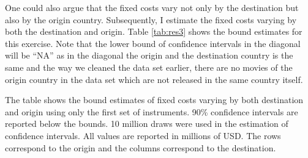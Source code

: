 \documentclass[11pt, letterpaper]{article} \usepackage{amsmath}
\newcommand{\floatintro}[1]{
  
  \vspace*{0.1in}
  
  {\footnotesize

    #1
    
  }
  
  \vspace*{0.1in} } \newcommand{\Hline}{\noindent\rule{18cm}{0.5pt}}
\begin{document}
One could also argue that the fixed costs vary not only by the
destination but also by the origin country. Subsequently, I estimate
the fixed costs varying by both the destination and origin. Table
\ref{tab:res3} shows the bound estimates for this exercise. Note that
the lower bound of confidence intervals in the diagonal will be ``NA''
as in the diagonal the origin and the destination country is the same
and the way we cleaned the data set earlier, there are no movies of
the origin country in the data set which are not released in the same
country itself.
\begin{table}[htbp!]
  \floatintro{The table shows the bound estimates of fixed costs
    varying by both destination and origin using only the first set of
    instruments. 90\% confidence intervals are reported below the
    bounds. 10 million draws were used in the estimation of confidence
    intervals. All values are reported in millions of USD. The rows correspond to the
    origin and the columns correspond to the destination.}
  \centering
  \caption{Bound estimates of fixed costs varying by origin and
    destination (in million USD)}
  \label{tab:res3}
\end{table}
\end{document}

